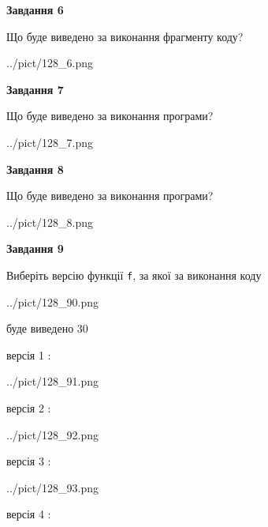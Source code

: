 \documentclass[12pt, ukrainian]{article}
\def\code#1{\Verb!#1!}
\begin{document}
{\begin {large}
{\begin {center}\textbf{Завдання 6}\end {center}}

Що буде виведено за виконання фрагменту коду?\par
\begin{center}
	{../pict/128_6.png}
\end{center}
\newpage

{\begin {center}\textbf{Завдання 7}\end {center}}

Що буде виведено за виконання програми?\par
\begin{center}
	{../pict/128_7.png}
\end{center}
\newpage

{\begin {center}\textbf{Завдання 8}\end {center}}

Що буде виведено за виконання програми?\par
\begin{center}
	{../pict/128_8.png}
\end{center}
\newpage

{\begin {center}\textbf{Завдання 9}\end {center}}

Виберіть версію функції \code{f}, за якої за виконання коду
\begin{center}
	{../pict/128_90.png}
\end{center}
буде виведено 30

\vspace{5mm}
версія 1 :

\begin{center}
	{../pict/128_91.png}
\end{center}
версія 2 :

\begin{center}
	{../pict/128_92.png}
\end{center}
версія 3 :

\begin{center}
	{../pict/128_93.png}
\end{center}
версія 4 :


\end{large}}
\end{document}
